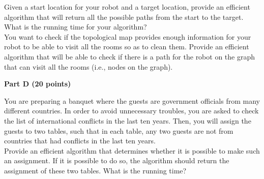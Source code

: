 \documentclass{article}
\begin{document}
 Given a start location for your robot and a target
location, provide an efficient algorithm that will return all the
possible paths from the start to the target.  What is the running time
for your algorithm?\\

 You want to check if the topological map provides
enough information for your robot to be able to visit all the rooms so
as to clean them. Provide an efficient algorithm that will be able to
check if there is a path for the robot on the graph that can visit all
the rooms (i.e., nodes on the graph).\\

\begin{center}
{\bf Part D (20 points)}
\end{center}

 You are preparing a banquet where the
guests are government officials from many different countries. In
order to avoid unnecessary troubles, you are asked to check the list
of international conflicts in the last ten years. Then, you will
assign the guests to two tables, such that in each table, any two
guests are not from countries that had conflicts in the last ten
years.\\

\noindent Provide an efficient algorithm that determines whether it is
possible to make such an assignment. If it is possible to do so, the
algorithm should return the assignment of these two tables. What is
the running time?
\end{document}

